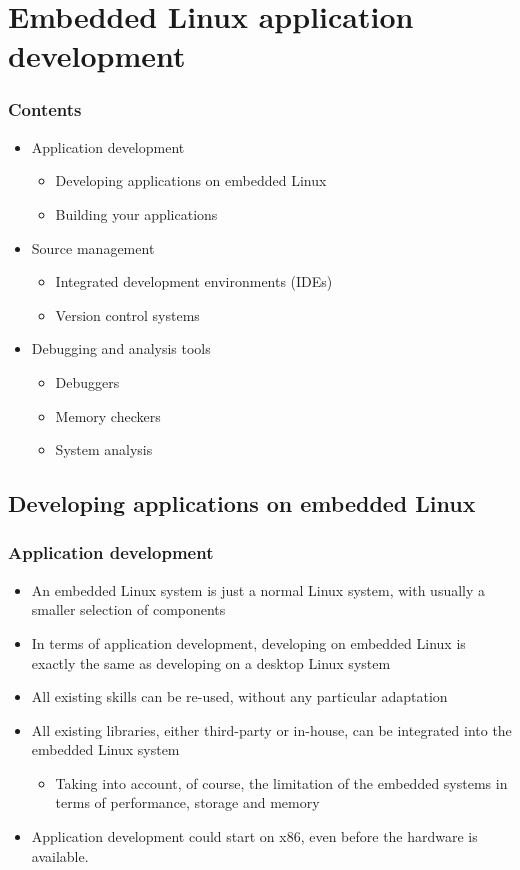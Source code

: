 \section{Embedded Linux application development}

\begin{frame}
  \frametitle{Contents}
  \begin{itemize}
  \item Application development
    \begin{itemize}
    \item Developing applications on embedded Linux
    \item Building your applications
    \end{itemize}
  \item Source management
    \begin{itemize}
    \item Integrated development environments (IDEs)
    \item Version control systems
    \end{itemize}
  \item Debugging and analysis tools
    \begin{itemize}
    \item Debuggers
    \item Memory checkers
    \item System analysis
    \end{itemize}
  \end{itemize}
\end{frame}

\subsection{Developing applications on embedded Linux}

\begin{frame}
  \frametitle{Application development}
  \begin{itemize}
  \item An embedded Linux system is just a normal Linux system, with
    usually a smaller selection of components
  \item In terms of application development, developing on embedded
    Linux is exactly the same as developing on a desktop Linux system
  \item All existing skills can be re-used, without any particular
    adaptation
  \item All existing libraries, either third-party or in-house, can be
    integrated into the embedded Linux system
    \begin{itemize}
    \item Taking into account, of course, the limitation of the
      embedded systems in terms of performance, storage and memory
    \end{itemize}
  \item Application development could start on x86, even before
      the hardware is available.
  \end{itemize}
\end{frame}

